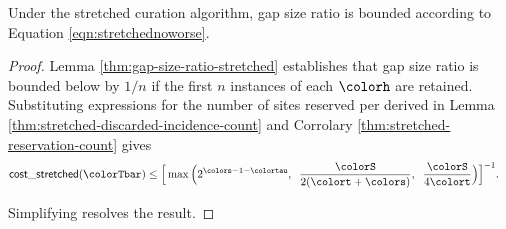 \begin{theorem}
\label{thm:stretched-gap-size}
Under the stretched curation algorithm, gap size ratio is bounded according to Equation \ref{eqn:stretchednoworse}.
\end{theorem}
\begin{proof}

Lemma \ref{thm:gap-size-ratio-stretched} establishes that gap size ratio is bounded below by $1/n$ if the first $n$ instances of each \hv{} $\colorh$ are retained.
Substituting expressions for the number of sites reserved per \hv{} derived in Lemma \ref{thm:stretched-discarded-incidence-count} and Corrolary \ref{thm:stretched-reservation-count} gives
\begin{align*}
  \mathsf{cost\_stretched}(\colorTbar)
  &\leq
  \Big[
    \max\Big(
      2^{\colors - 1 - \colortau},\;\;
      \frac{\colorS}{2(\colort + \colors)},\;\;
      \frac{\colorS}{4\colort}
    \Big)
  \Big]^{-1}.
\end{align*}

Simplifying resolves the result.

\end{proof}
